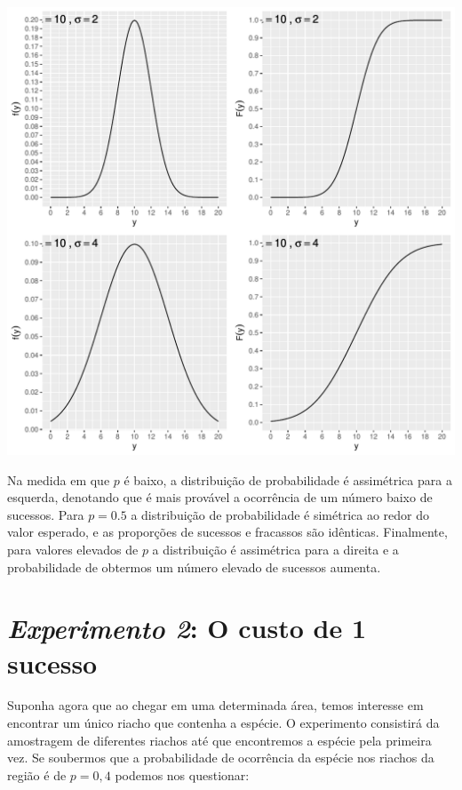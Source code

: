 \documentclass[
]{book}
\begin{document}
\begin{center}\includegraphics{probest-cambientais_files/figure-latex/unnamed-chunk-206-1} \end{center}

Na medida em que \(p\) é baixo, a distribuição de probabilidade é assimétrica para a esquerda, denotando que é mais provável a ocorrência de um número baixo de sucessos. Para \(p = 0.5\) a distribuição de probabilidade é simétrica ao redor do valor esperado, e as proporções de sucessos e fracassos são idênticas. Finalmente, para valores elevados de \(p\) a distribuição é assimétrica para a direita e a probabilidade de obtermos um número elevado de sucessos aumenta.

\hypertarget{experimento-2-o-custo-de-1-sucesso}{%
\section{\texorpdfstring{\emph{Experimento 2}: O custo de 1 sucesso}{Experimento 2: O custo de 1 sucesso}}\label{experimento-2-o-custo-de-1-sucesso}}

Suponha agora que ao chegar em uma determinada área, temos interesse em encontrar um único riacho que contenha a espécie. O experimento consistirá da amostragem de diferentes riachos até que encontremos a espécie pela primeira vez. Se soubermos que a probabilidade de ocorrência da espécie nos riachos da região é de \(p = 0,4\) podemos nos questionar:
\end{document}
